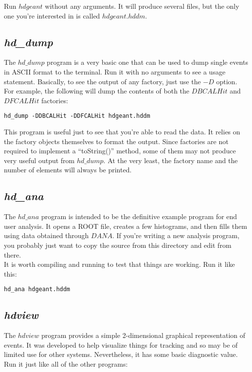\documentclass[12pt]{article}
\begin{document}
Run $hdgeant$ without any arguments. It will produce several files,
but the only one you're interested in is called $hdgeant.hddm$.

\subsection{{\it hd\_dump}}
The $hd\_dump$ program is a very basic one that can be used to dump
single events in ASCII format to the terminal. Run it with no arguments
to see a usage statement. Basically, to see the output of any factory,
just use the $-D$ option. For example, the following will dump the contents
of both the $DBCALHit$ and $DFCALHit$ factories:

\begin{lstlisting}[frame=shadowbox,backgroundcolor=\color{cmdbkgd}]
hd_dump -DDBCALHit -DDFCALHit hdgeant.hddm
\end{lstlisting}

This program is useful just to see that you're able to read the
data. It relies on the factory objects themselves to format the
output. Since factories are not required to implement a
``toString()'' method, some of them may not produce very useful output
from $hd\_dump$. At the very least, the factory name and the number
of elements will always be printed.

\subsection{{\it hd\_ana}}
The $hd\_ana$ program is intended to be the definitive example
program for end user analysis. It opens a ROOT file, creates a
few histograms, and then fills them using data obtained through
$DANA$. If you're writing a new analysis program, you probably just
want to copy the source from this directory and edit from there.\\

It is worth compiling and running to test that things are working.
Run it like this:

\begin{lstlisting}[frame=shadowbox,backgroundcolor=\color{cmdbkgd}]
hd_ana hdgeant.hddm
\end{lstlisting}

\subsection{{\it hdview}}
The $hdview$ program provides a simple 2-dimensional graphical
representation
of events. It was developed to help visualize things for tracking
and so may be of limited use for other systems. Nevertheless,
it has some basic diagnostic value. Run it just like all of the
other programs:
\end{document}
